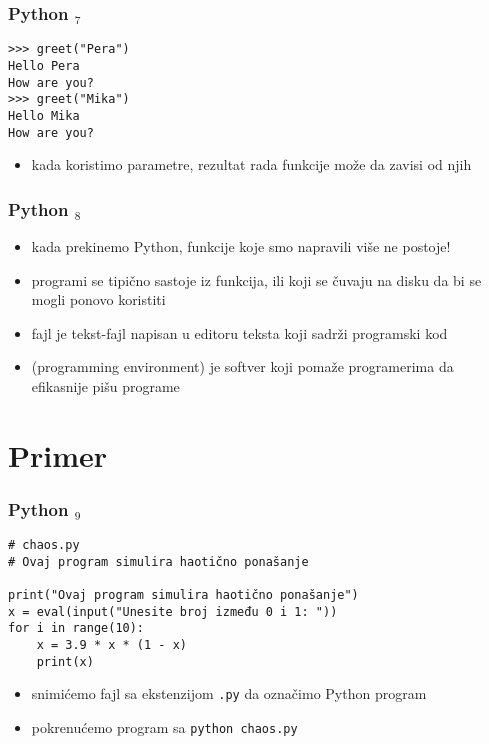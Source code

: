 \documentclass[utf8,compress]{beamer}
\begin{document}
\begin{frame}[fragile]
\frametitle{Python $_7$}
\begin{verbatim}
>>> greet("Pera")
Hello Pera
How are you?
>>> greet("Mika")
Hello Mika
How are you?
\end{verbatim}
\begin{itemize}
  \item kada koristimo parametre, rezultat rada funkcije može da zavisi od njih
\end{itemize}
\end{frame}

\begin{frame}[fragile]
\frametitle{Python $_8$}
\begin{itemize}
  \item kada prekinemo Python, funkcije koje smo napravili više ne postoje!
  \item programi se tipično sastoje iz funkcija,  ili  koji se čuvaju na disku da bi se mogli ponovo koristiti
  \item {} fajl je tekst-fajl napisan u editoru teksta koji sadrži programski kod
  \item {} (programming environment) je softver koji pomaže programerima da efikasnije pišu programe
\end{itemize}
\end{frame}

\section{Primer}

\begin{frame}[fragile]
\frametitle{Python $_9$}
\begin{verbatim}
# chaos.py
# Ovaj program simulira haotično ponašanje

print("Ovaj program simulira haotično ponašanje")
x = eval(input("Unesite broj između 0 i 1: "))
for i in range(10):
    x = 3.9 * x * (1 - x)
    print(x)
\end{verbatim}
\begin{itemize}
  \item snimićemo fajl sa ekstenzijom \texttt{.py} da označimo Python program
  \item pokrenućemo program sa \texttt{python chaos.py}
\end{itemize}
\end{frame}
\end{document}
